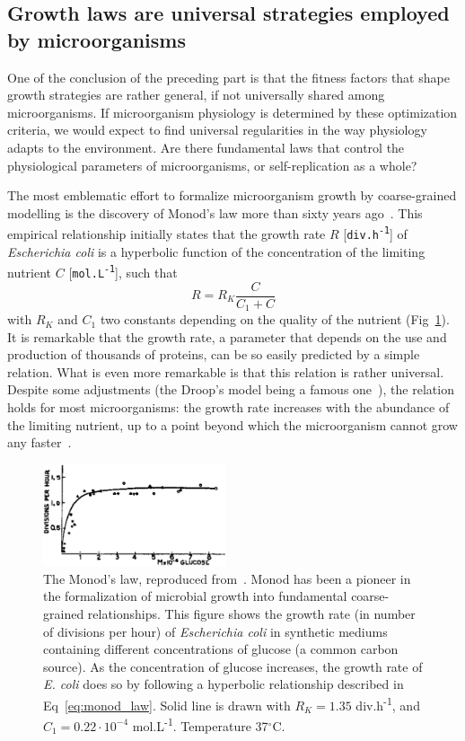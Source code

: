 \subsection{Growth laws are universal strategies employed by microorganisms}

One of the conclusion of the preceding part is that the fitness factors that shape growth strategies are rather general, if not universally shared among microorganisms.
If microorganism physiology is determined by these optimization criteria, we would expect to find universal regularities in the way physiology adapts to the environment.
Are there fundamental laws that control the physiological parameters of microorganisms, or self-replication as a whole?

The most emblematic effort to formalize microorganism growth by coarse-grained modelling is the discovery of Monod's law more than sixty years ago~\cite{monod_growth_1949}.
This empirical relationship initially states that the growth rate $R$ [\texttt{div.h\textsuperscript{-1}}] of \textit{Escherichia coli} is a hyperbolic function of the concentration of the limiting nutrient $C$ [\texttt{mol.L\textsuperscript{-1}}], such that
\begin{equation}
\label{eq:monod_law}
R = R_K \frac{C}{C_1 + C}
\end{equation}
with $R_K$ and $C_1$ two constants depending on the quality of the nutrient (Fig~\ref{fig:monod_law}).
It is remarkable that the growth rate, a parameter that depends on the use and production of thousands of proteins, can be so easily predicted by a simple relation.
What is even more remarkable is that this relation is rather universal.
Despite some adjustments (the Droop's model being a famous one~\cite{droop_thoughts_1973}), the relation holds for most microorganisms: the growth rate increases with the abundance of the limiting nutrient, up to a point beyond which the microorganism cannot grow any faster~\cite{koch_why_1988}.

\begin{figure}[!h]
\centering
\includegraphics[height=3cm]{./Fig/Chapter1/monod_law.eps}
\caption{The Monod's law, reproduced from~\cite{monod_growth_1949}.
Monod has been a pioneer in the formalization of microbial growth into fundamental coarse-grained relationships.
This figure shows the growth rate (in number of divisions per hour) of \textit{Escherichia coli} in synthetic mediums containing different concentrations of glucose (a common carbon source).
As the concentration of glucose increases, the growth rate of \textit{E. coli} does so by following a hyperbolic relationship described in Eq~\ref{eq:monod_law}.
Solid line is drawn with $R_K = 1.35$ div.h\textsuperscript{-1}, and $C_1 = 0.22 \cdot 10^{-4}$ mol.L\textsuperscript{-1}. Temperature 37$^{\circ}$C.
}
\label{fig:monod_law}
\end{figure}

